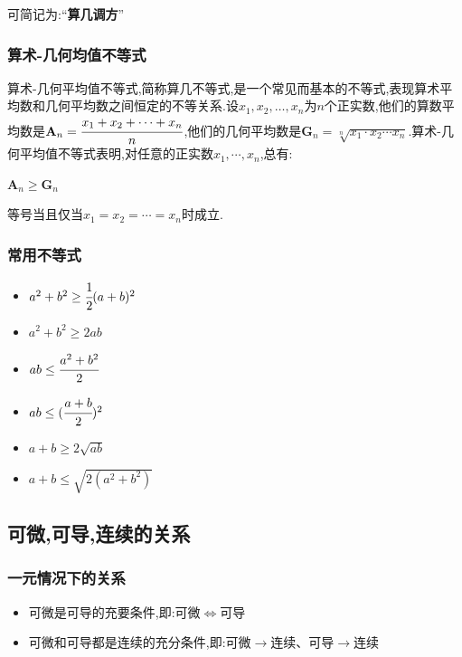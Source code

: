 \documentclass[UTF8,12pt]{ctexbook}
\begin{document}
{{{{可简记为:“{\bfseries 算几调方}”
}%

\subsubsection{算术-几何均值不等式}{
  算术-几何平均值不等式,简称算几不等式,是一个常见而基本的不等式,表现算术平均数和几何平均数之间恒定的不等关系.设$x_1,x_2,\dots,x_n$为$n$个正实数,他们的算数平均数是$\mathbf{A}_n = \cfrac{x_1 + x_2 + \dotsm + x_n}{n}$,他们的几何平均数是$\mathbf{G}_n = \sqrt[n]{x_1\cdot x_2 \dotsm x_n}$.算术-几何平均值不等式表明,对任意的正实数$x_1,\dotsm,x_n$,总有:

  \begin{center}
    $\mathbf{A}_n\geq\mathbf{G}_n$
  \end{center}

  等号当且仅当$x_1 = x_2 = \dotsm = x_n$时成立.

}%

\subsubsection{常用不等式}{
  \begin{itemize}
    \item $a^2 + b^2 \geq \cfrac{1}{2}(a + b)^2$
    \item $a^2 + b^2 \geq 2ab$
    \item $ab \leq \cfrac{a^2 + b^2}{2}$
    \item $ab \leq (\cfrac{a + b}{2})^2$
    \item $a + b \geq 2\sqrt{ab}$
    \item $a + b \leq \sqrt{2(a^2 + b^2)}$
  \end{itemize}
}%

}%

\subsection{可微,可导,连续的关系}{

  \subsubsection{一元情况下的关系}{
    \begin{itemize}
      \item 可微是可导的充要条件,即:可微$\Leftrightarrow$可导
      \item 可微和可导都是连续的充分条件,即:可微$\rightarrow$连续、可导$\rightarrow$连续
    \end{itemize}

}}}}
\end{document}
